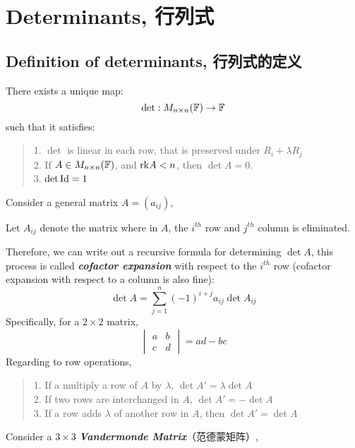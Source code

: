 \section{Determinants, 行列式}
\subsection{Definition of determinants, 行列式的定义}
\begin{definition}
    There exists a unique map:
    $$\det : M_{n \times n}(\mathbb{F}) \to \mathbb{F}$$
    such that it satisfies:
    \begin{quote}
        1. $\det$ is linear in each row, that is preserved under $R_i + \lambda R_j$ \\
        2. If $A \in M_{n \times n}(\mathbb{F})$, and $\text{rk} A < n$, then $\det A = 0$. \\
        3. $\det \text{Id} = 1$
    \end{quote}
\end{definition}
Consider a general matrix $A = (a_{ij})$,
\begin{definition}
    Let $A_{ij}$ denote the matrix where in $A$, the $i^{th}$ row and $j^{th}$ column is eliminated.
\end{definition}
Therefore, we can write out a recursive formula for determining $\det A$, this process is called \textbf{\textit{cofactor expansion}} with respect to the $i^{th}$ row (cofactor expansion with respect to a column is also fine):
$$\det A = \sum_{j=1}^n (-1)^{i + j} a_{ij} \det A_{ij}$$
Specifically, for a $2 \times 2$ matrix,
$$\begin{vmatrix}
    a & b \\
    c & d
\end{vmatrix} = ad - bc$$
Regarding to row operations, 
\begin{quote}
    1. If a multiply a row of $A$ by $\lambda$, $\det A' = \lambda \det A$ \\
    2. If two rows are interchanged in $A$, $\det A' = - \det A$ \\
    3. If a row adds $\lambda$ of another row in $A$, then $\det A' = \det A$
\end{quote}
Consider a $3 \times 3$ \textbf{\textit{Vandermonde Matrix}}（范德蒙矩阵）,
